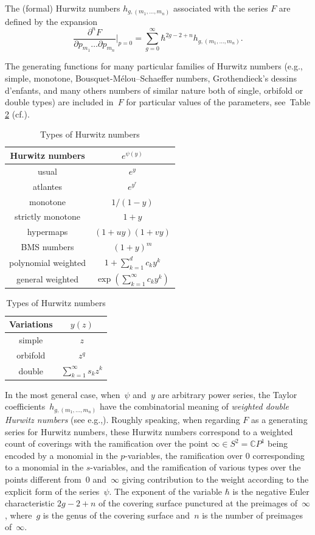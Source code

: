 \documentclass[11pt]{article}
\newcommand{\eg}{e.g.,\xspace}
\newcommand{\cf}{cf.\xspace}
\newcommand{\C}{\mathbb{C}}
\theoremstyle{plain}
\theoremstyle{definition}
\theoremstyle{remark}
\begin{document}
The (formal) Hurwitz numbers $h_{g,(m_1,\dots,m_n)}$ associated with the series $F$ are defined by the expansion\vspace*{-5pt}
\begin{equation*}
\frac{\partial^n F}{\partial p_{m_1}\dots\partial p_{m_n}}\Big|_{p=0}=
\sum_{g=0}^\infty\hbar^{2g-2+n}h_{g,(m_1,\dots,m_n)}.
\end{equation*}

The generating functions for many particular families of Hurwitz numbers (\eg simple, monotone, Bousquet-Mélou--Schaeffer numbers, Grothendieck's dessins d'enfants, and many others numbers of similar nature both of single, orbifold or double types) are included in~$F$ for particular values of the parameters, see~Table \ref{tab:Hurw} (\cf \cite{ACEH-1,ALS,Harnad2014,KazLand}).
\begin{table}[htb]
\caption{Types of Hurwitz numbers}\label{tab:Hurw}
\renewcommand{\arraystretch}{1.3}
\begin{tabular}{|c|c|}
\hline
Hurwitz numbers & $e^{\psi(y)}$\\
\hline
\hline
usual & $e^{y}$ \\
atlantes
& $e^{y^r}$ \\
monotone & $1/(1-y)$ \\
strictly monotone & $1+y$ \\
hypermaps & $(1+uy)(1+vy)$\\
BMS numbers & $(1+y)^m$ \\
polynomial weighted& $1+\sum_{k=1}^d c_k y^k$\\
\hline
general weighted & $\exp\left({\sum_{k=1}^\infty c_k y^k}\right)$\\
\hline
\end{tabular} \quad \begin{tabular}{|c|c|}
\hline
Variations & $y(z)$\\
\hline
\hline
simple & $z$ \\
orbifold & $z^q$ \\
\hline
double & $\sum_{k=1}^\infty s_kz^k$ \\
\hline
\end{tabular}
\end{table}

In the most general case, when~$\psi$ and~$y$ are arbitrary power series, the Taylor coefficients~$h_{g,(m_1,\dots,m_n)}$ have the combinatorial meaning of \emph{weighted double Hurwitz numbers} (see \eg \cite{Harnad2014}).
Roughly speaking, when regarding $F$ as a generating series for Hurwitz numbers, these Hurwitz numbers correspond to a weighted count of coverings with the ramification over the point $\infty\in S^2=\C P^1$ being encoded by a monomial in the $p$-variables, the ramification over $0$ corresponding to a monomial in the $s$\nobreakdash-variables, and the ramification of various types over the points different from~$0$ and~$\infty$ giving contribution to the weight according to the explicit form of the series~$\psi$. The exponent of the variable $\hbar$ is the negative Euler characteristic $2g-2+n$ of the covering surface punctured at the preimages of~$\infty$, where~$g$ is the genus of the covering surface and~$n$ is the number of preimages of~$\infty$.
\end{document}
